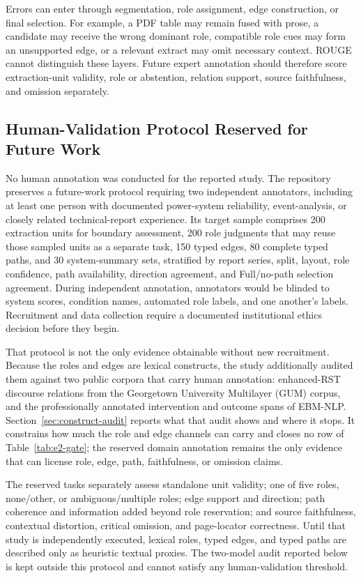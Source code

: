 \documentclass[information,article,submit,moreauthors]{Definitions/mdpi}
\begin{document}
Errors can enter through segmentation, role assignment, edge construction, or final selection. For example, a PDF table may remain fused with prose, a candidate may receive the wrong dominant role, compatible role cues may form an unsupported edge, or a relevant extract may omit necessary context. ROUGE cannot distinguish these layers. Future expert annotation should therefore score extraction-unit validity, role or abstention, relation support, source faithfulness, and omission separately.

\subsection{Human-Validation Protocol Reserved for Future Work}
\label{sec:human-validation-protocol}

No human annotation was conducted for the reported study. The repository preserves a future-work protocol requiring two independent annotators, including at least one person with documented power-system reliability, event-analysis, or closely related technical-report experience. Its target sample comprises 200 extraction units for boundary assessment, 200 role judgments that may reuse those sampled units as a separate task, 150 typed edges, 80 complete typed paths, and 30 system-summary sets, stratified by report series, split, layout, role confidence, path availability, direction agreement, and Full/no-path selection agreement. During independent annotation, annotators would be blinded to system scores, condition names, automated role labels, and one another's labels. Recruitment and data collection require a documented institutional ethics decision before they begin.

That protocol is not the only evidence obtainable without new recruitment. Because the roles and edges are lexical constructs, the study additionally audited them against two public corpora that carry human annotation: enhanced-RST discourse relations from the Georgetown University Multilayer (GUM) corpus, and the professionally annotated intervention and outcome spans of EBM-NLP. Section~\ref{sec:construct-audit} reports what that audit shows and where it stops. It constrains how much the role and edge channels can carry and closes no row of Table~\ref{tab:e2-gate}; the reserved domain annotation remains the only evidence that can license role, edge, path, faithfulness, or omission claims.

The reserved tasks separately assess standalone unit validity; one of five roles, none/other, or ambiguous/multiple roles; edge support and direction; path coherence and information added beyond role reservation; and source faithfulness, contextual distortion, critical omission, and page-locator correctness. Until that study is independently executed, lexical roles, typed edges, and typed paths are described only as heuristic textual proxies. The two-model audit reported below is kept outside this protocol and cannot satisfy any human-validation threshold.
\end{document}
